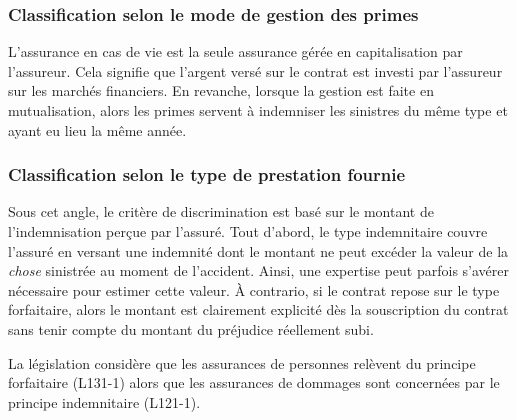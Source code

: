 \documentclass{article}
\begin{document}
\subsubsection{Classification selon le mode de gestion des primes}
L'assurance en cas de vie est la seule assurance gérée en capitalisation par l'assureur. Cela signifie que l'argent versé sur le contrat est investi par l'assureur sur les marchés financiers. En revanche, lorsque la gestion est faite en mutualisation, alors les primes servent à indemniser les sinistres du même type et ayant eu lieu la même année.

\subsubsection{Classification selon le type de prestation fournie}
Sous cet angle, le critère de discrimination est basé sur le montant de l'indemnisation perçue par l'assuré. Tout d'abord, le type indemnitaire couvre l'assuré en versant une indemnité dont le montant ne peut excéder la valeur de la \textit{chose} sinistrée au moment de l'accident. Ainsi, une expertise peut parfois s'avérer nécessaire pour estimer cette valeur. À contrario, si le contrat repose sur le type forfaitaire, alors le montant est clairement explicité dès la souscription du contrat sans tenir compte du montant du préjudice réellement subi.

La législation considère que les assurances de personnes relèvent du principe forfaitaire (L131-1) alors que les assurances de dommages sont concernées par le principe indemnitaire (L121-1).
\end{document}
